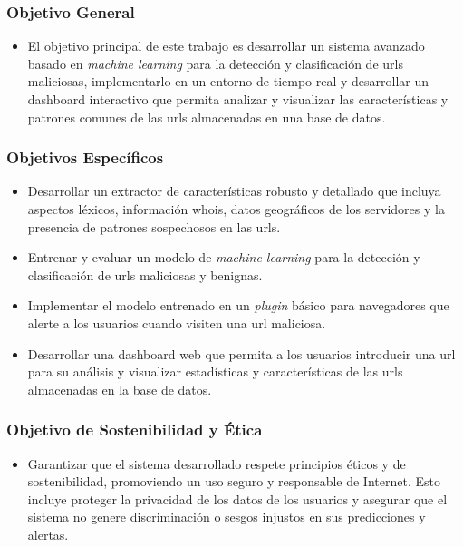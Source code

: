 \subsubsection{Objetivo General}
\begin{itemize}
  \item El objetivo principal de este trabajo es desarrollar un sistema avanzado basado en \textit{machine learning} para la detección y clasificación de \glspl{url} maliciosas, implementarlo en un entorno de tiempo real y desarrollar un \gls{dashboard} interactivo que permita analizar y visualizar las características y patrones comunes de las \glspl{url} almacenadas en una base de datos.


\end{itemize}

\subsubsection{Objetivos Específicos}
\begin{itemize}
    \item Desarrollar un extractor de características robusto y detallado que incluya aspectos léxicos, información \gls{whois}, datos geográficos de los servidores y la presencia de patrones sospechosos en las \glspl{url}.
    \item Entrenar y evaluar un modelo de \textit{machine learning} para la detección y clasificación de \glspl{url} maliciosas y benignas.
    \item Implementar el modelo entrenado en un \textit{\gls{plugin}} básico para navegadores que alerte a los usuarios cuando visiten una \gls{url} maliciosa.
    \item Desarrollar una \gls{dashboard} web que permita a los usuarios introducir una \gls{url} para su análisis y visualizar estadísticas y características de las \glspl{url} almacenadas en la base de datos.
\end{itemize}

\subsubsection{Objetivo de Sostenibilidad y Ética}
\begin{itemize}
  \item 
Garantizar que el sistema desarrollado respete principios éticos y de sostenibilidad, promoviendo un uso seguro y responsable de Internet. Esto incluye proteger la privacidad de los datos de los usuarios y asegurar que el sistema no genere discriminación o sesgos injustos en sus predicciones y alertas.


\end{itemize}

